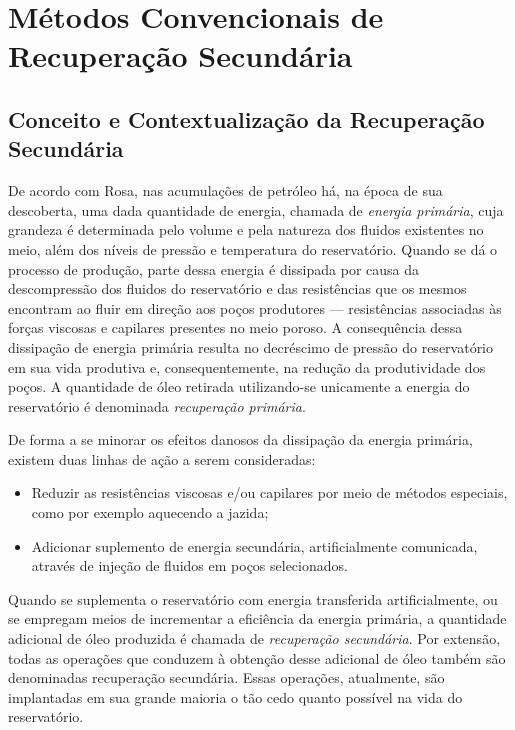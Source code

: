 
\section{M\'{e}todos Convencionais de Recupera\c{c}\~{a}o Secund\'{a}ria}

\subsection{Conceito e Contextualiza\c{c}\~{a}o da Recupera\c{c}\~{a}o Secund\'{a}ria}

De acordo com Rosa, nas acumula\c{c}\~{o}es de petr\'{o}leo h\'{a}, na \'{e}poca de sua descoberta, uma dada quantidade de energia, chamada de \textit{energia prim\'{a}ria}, cuja grandeza \'{e} determinada pelo volume e pela natureza dos fluidos existentes no meio, al\'{e}m dos n\'{i}veis de press\~{a}o e temperatura do reservat\'{o}rio. Quando se d\'{a} o processo de produ\c{c}\~{a}o, parte dessa energia \'{e} dissipada por causa da descompress\~{a}o dos fluidos do reservat\'{o}rio e das resist\^{e}ncias que os mesmos encontram ao fluir em dire\c{c}\~{a}o aos po\c{c}os produtores --- resist\^{e}ncias associadas \`{a}s for\c{c}as viscosas e capilares presentes no meio poroso. A consequ\^{e}ncia dessa dissipa\c{c}\~{a}o de energia prim\'{a}ria resulta no decr\'{e}scimo de press\~{a}o do reservat\'{o}rio em sua vida produtiva e, consequentemente, na redu\c{c}\~{a}o da produtividade dos po\c{c}os. A quantidade de \'{o}leo retirada utilizando-se unicamente a energia do reservat\'{o}rio \'{e} denominada \textit{recupera\c{c}\~{a}o prim\'{a}ria}.

De forma a se minorar os efeitos danosos da dissipa\c{c}\~{a}o da energia prim\'{a}ria, existem duas linhas de a\c{c}\~{a}o a serem consideradas:

\begin{itemize}
\item Reduzir as resist\^{e}ncias viscosas e/ou capilares por meio de m\'{e}todos especiais, como por exemplo aquecendo a jazida;
\item Adicionar suplemento de energia secund\'{a}ria, artificialmente comunicada, atrav\'{e}s de inje\c{c}\~{a}o de fluidos em po\c{c}os selecionados.
\end{itemize}

Quando se suplementa o reservat\'{o}rio com energia transferida artificialmente, ou se empregam meios de incrementar a efici\^{e}ncia da energia prim\'{a}ria, a quantidade adicional de \'{o}leo produzida \'{e} chamada de \textit{recupera\c{c}\~{a}o secund\'{a}ria}. Por extens\~{a}o, todas as opera\c{c}\~{o}es que conduzem \`{a} obten\c{c}\~{a}o desse adicional de \'{o}leo tamb\'{e}m s\~{a}o denominadas recupera\c{c}\~{a}o secund\'{a}ria. Essas opera\c{c}\~{o}es, atualmente, s\~{a}o implantadas em sua grande maioria o t\~{a}o cedo quanto poss\'{i}vel na vida do reservat\'{o}rio.

